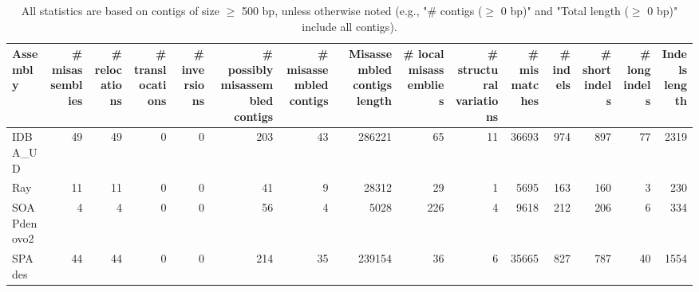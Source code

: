 \documentclass[12pt,a4paper]{article}
\begin{document}
\begin{table}[ht]
\begin{center}
\caption{All statistics are based on contigs of size $\geq$ 500 bp, unless otherwise noted (e.g., "\# contigs ($\geq$ 0 bp)" and "Total length ($\geq$ 0 bp)" include all contigs).}
\begin{tabular}{|l*{14}{|r}|}
\hline
Assembly & \# misassemblies &     \# relocations &     \# translocations &     \# inversions & \# possibly misassembled contigs & \# misassembled contigs & Misassembled contigs length & \# local misassemblies & \# structural variations & \# mismatches & \# indels &     \# short indels &     \# long indels & Indels length \\ \hline
IDBA\_UD & 49 & 49 & 0 & 0 & 203 & 43 & 286221 & 65 & 11 & 36693 & 974 & 897 & 77 & 2319 \\ \hline
Ray & 11 & 11 & 0 & 0 & 41 & 9 & 28312 & 29 & 1 & 5695 & 163 & 160 & 3 & 230 \\ \hline
SOAPdenovo2 & 4 & 4 & 0 & 0 & 56 & 4 & 5028 & 226 & 4 & 9618 & 212 & 206 & 6 & 334 \\ \hline
SPAdes & 44 & 44 & 0 & 0 & 214 & 35 & 239154 & 36 & 6 & 35665 & 827 & 787 & 40 & 1554 \\ \hline
\end{tabular}
\end{center}
\end{table}
\end{document}
